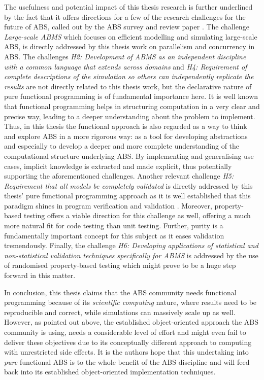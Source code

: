 The usefulness and potential impact of this thesis research is further underlined by the fact that it offers directions for a few of the research challenges for the future of ABS, called out by the ABS survey and review paper \cite{macal_everything_2016}. The challenge \textit{Large-scale ABMS} which focuses on efficient modelling and simulating large-scale ABS, is directly addressed by this thesis work on parallelism and concurrency in ABS. The challenges \emph{H2: Development of ABMS as an independent discipline with a common language that extends across domains} and \emph{H4: Requirement of complete descriptions of the simulation so others can independently replicate the results} are not directly related to this thesis work, but the declarative nature of pure functional programming is of fundamental importance here. It is well known that functional programming helps in structuring computation in a very clear and precise way, leading to a deeper understanding about the problem to implement. Thus, in this thesis the functional approach is also regarded as a way to think and explore ABS in a more rigorous way: as a tool for developing abstractions and especially to develop a deeper and more complete understanding of the computational structure underlying ABS. By implementing and generalising use cases, implicit knowledge is extracted and made explicit, thus potentially supporting the aforementioned challenges. Another relevant challenge \emph{H5: Requirement that all models be completely validated} is directly addressed by this thesis' pure functional programming approach as it is well established that this paradigm shines in program verification and validation \cite{hutton_tutorial_1999}. Moreover, property-based testing offers a viable direction for this challenge as well, offering a much more natural fit for code testing than unit testing. Further, purity is a fundamentally important concept for this subject as it eases validation tremendously. Finally, the challenge \emph{H6: Developing applications of statistical and non-statistical validation techniques specifically for ABMS} is addressed by the use of randomised property-based testing which might prove to be a huge step forward in this matter.

\medskip

In conclusion, this thesis claims that the ABS community needs functional programming because of its \textit{scientific computing} nature, where results need to be reproducible and correct, while simulations can massively scale up as well. However, as pointed out above, the established object-oriented approach the ABS community is using, needs a considerable level of effort and might even fail to deliver these objectives due to its conceptually different approach to computing with unrestricted side effects. It is the authors hope that this undertaking into \textit{pure} functional ABS is to the whole benefit of the ABS discipline and will feed back into its established object-oriented implementation techniques.

